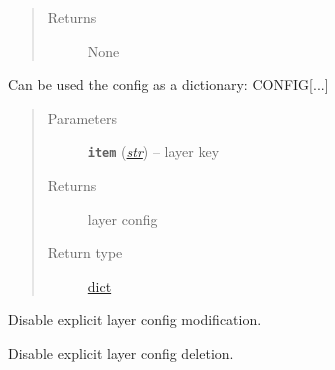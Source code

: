 \documentclass[letterpaper,10pt,english]{sphinxmanual}
\begin{document}
\begin{fulllineitems}
\begin{fulllineitems}
\begin{quote}
\begin{description}
\item[{Returns}] \leavevmode
None

\end{description}\end{quote}

\end{fulllineitems}


\begin{fulllineitems}
\label{util/misc:escape.util.misc.ESCAPEConfig.__getitem__}
Can be used the config as a dictionary: CONFIG{[}...{]}
\begin{quote}\begin{description}
\item[{Parameters}] \leavevmode
\textbf{\texttt{item}} (\href{https://docs.python.org/2.7/library/functions.html\#str}{\emph{str}}) -- layer key

\item[{Returns}] \leavevmode
layer config

\item[{Return type}] \leavevmode
\href{https://docs.python.org/2.7/library/stdtypes.html\#dict}{dict}

\end{description}\end{quote}

\end{fulllineitems}


\begin{fulllineitems}
\label{util/misc:escape.util.misc.ESCAPEConfig.__setitem__}
Disable explicit layer config modification.

\end{fulllineitems}


\begin{fulllineitems}
\label{util/misc:escape.util.misc.ESCAPEConfig.__delitem__}
Disable explicit layer config deletion.

\end{fulllineitems}


\end{fulllineitems}
\end{document}
